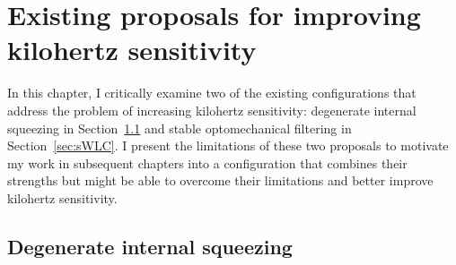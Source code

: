 \chapter{Existing proposals for improving kilohertz sensitivity} %
\label{chp:proposals}

In this chapter, I critically examine two of the existing configurations that address the problem of increasing kilohertz sensitivity: degenerate internal squeezing in Section~\ref{sec:dIS} and stable optomechanical filtering in Section~\ref{sec:sWLC}.
I present the limitations of these two proposals to motivate my work in subsequent chapters into a configuration that combines their strengths but might be able to overcome their limitations and better improve kilohertz sensitivity. 


\section{Degenerate internal squeezing}
\label{sec:dIS}

